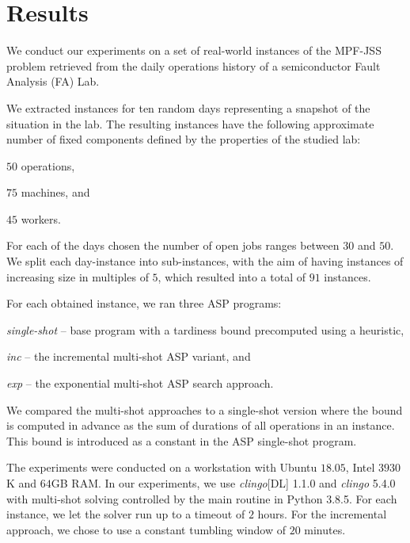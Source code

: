 \documentclass[submission,copyright,creativecommons]{eptcs}
\newcommand{\jss}{MPF-JSS\xspace}
\begin{document}
\section{Results}

We conduct our experiments on a set of real-world instances of the \jss problem retrieved from the daily operations history of a semiconductor Fault Analysis (FA) Lab.%

We extracted instances for ten random days representing a snapshot of the situation in the lab. The resulting instances have the following approximate number of fixed components defined by the properties of the studied lab:
\begin{enumerate*}[label=\emph{(\roman*)}]
	\item $50$ operations,
	\item $75$ machines, and 
	\item $45$ workers.
\end{enumerate*}
For each of the days chosen the number of open jobs ranges between $30$ and $50$. We split each day-instance into sub-instances, with the aim of having instances of increasing size in multiples of $5$, which resulted into a total of $91$ instances.

For each obtained instance, we ran three ASP programs: 
\begin{enumerate*}[label=\emph{(\roman*)}]	
	\item \emph{single-shot} -- base program with a tardiness bound precomputed using a heuristic,
	\item \emph{inc} -- the incremental multi-shot ASP variant, and 
	\item \emph{exp} -- the exponential multi-shot ASP search approach.
\end{enumerate*}
We compared the multi-shot approaches to a single-shot version where the bound is computed in advance as the sum of durations of all operations in an instance.
This bound is introduced as a constant in the ASP single-shot program.

The experiments were conducted on a workstation with Ubuntu $18.05$, Intel  $3930$K and $64$GB RAM. In our experiments, we use \emph{clingo}[DL] 1.1.0 and \emph{clingo} 5.4.0 with multi-shot solving controlled by the main routine in Python 3.8.5. For each instance, we let the solver run up to a timeout of $2$ hours. For the incremental approach, we chose to use a constant tumbling window of $20$ minutes.
\end{document}

